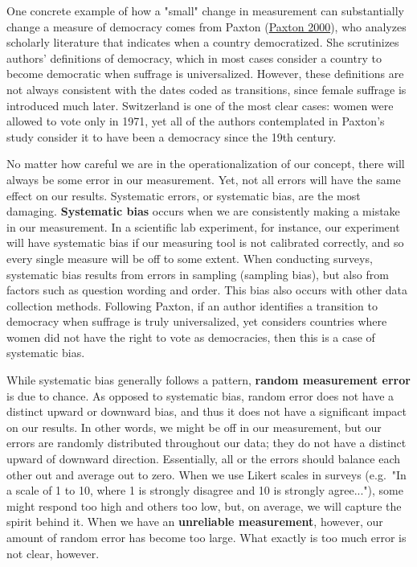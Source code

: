 \documentclass{book}
\begin{document}
One concrete example of how a "small" change in measurement can substantially
change a measure of democracy comes from Paxton
(\protect\hyperlink{ref-paxton2000}{Paxton 2000}), who analyzes scholarly
literature that indicates when a country democratized. She scrutinizes
authors' definitions of democracy, which in most cases consider a country to
become democratic when suffrage is universalized. However, these definitions
are not always consistent with the dates coded as transitions, since female
suffrage is introduced much later. Switzerland is one of the most clear cases:
women were allowed to vote only in 1971, yet all of the authors contemplated
in Paxton's study consider it to have been a democracy since the 19th century.

No matter how careful we are in the operationalization of our concept, there
will always be some error in our measurement. Yet, not all errors will have
the same effect on our results. Systematic errors, or systematic bias, are the
most damaging. \textbf{Systematic bias} occurs when we are consistently making
a mistake in our measurement. In a scientific lab experiment, for instance,
our experiment will have systematic bias if our measuring tool is not
calibrated correctly, and so every single measure will be off to some extent.
When conducting surveys, systematic bias results from errors in sampling
(sampling bias), but also from factors such as question wording and order.
This bias also occurs with other data collection methods. Following Paxton, if
an author identifies a transition to democracy when suffrage is truly
universalized, yet considers countries where women did not have the right to
vote as democracies, then this is a case of systematic bias.

While systematic bias generally follows a pattern, \textbf{random measurement
error} is due to chance. As opposed to systematic bias, random error does not
have a distinct upward or downward bias, and thus it does not have a
significant impact on our results. In other words, we might be off in our
measurement, but our errors are randomly distributed throughout our data; they
do not have a distinct upward of downward direction. Essentially, all or the
errors should balance each other out and average out to zero. When we use
Likert scales in surveys (e.g.~"In a scale of 1 to 10, where 1 is strongly
disagree and 10 is strongly agree..."), some might respond too high and others
too low, but, on average, we will capture the spirit behind it. When we have
an \textbf{unreliable measurement}, however, our amount of random error has
become too large. What exactly is too much error is not clear, however.
\end{document}
